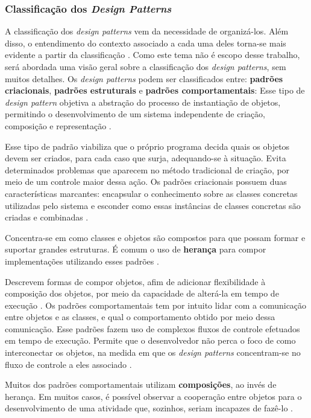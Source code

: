 \subsubsection{Classificação dos \textit{Design Patterns}}
A classificação dos \textit{design patterns} vem da necessidade de organizá-los. Além disso, o entendimento do contexto associado a cada uma deles torna-se mais evidente a partir da classificação \cite{gammaEtAl1994}. Como este tema não é escopo desse trabalho, será abordada uma visão geral sobre a classificação dos \textit{design patterns}, sem muitos detalhes. Os \textit{design patterns} podem ser classificados entre: \textbf{padrões criacionais}, \textbf{padrões estruturais} e \textbf{padrões comportamentais}:
Esse tipo de \textit{design pattern} objetiva a abstração do processo de instantiação de objetos, permitindo o desenvolvimento de um sistema independente de criação, composição e representação \cite{gammaEtAl1994}.
\par
\indent Esse tipo de padrão viabiliza que o próprio programa decida quais os objetos devem ser criados, para cada caso que surja, adequando-se à situação. Evita determinados problemas que aparecem no método tradicional de criação, por meio de um controle maior dessa ação. Os padrões criacionais possuem duas características marcantes: encapsular o conhecimento sobre as classes concretas utilizadas pelo sistema e esconder como essas instâncias de classes concretas são criadas e combinadas \cite{gammaEtAl1994}.
\par
\indent Concentra-se em como classes e objetos são compostos para que possam formar e suportar grandes estruturas. É comum o uso de \textbf{herança} para compor implementações utilizando esses padrões \cite{gammaEtAl1994}.
\par
\indent Descrevem formas de compor objetos, afim de adicionar flexibilidade à composição dos objetos, por meio da capacidade de alterá-la em tempo de execução \cite{gammaEtAl1994}.
Os padrões comportamentais tem por intuito lidar com a comunicação entre objetos e as classes, e qual o comportamento obtido por meio dessa comunicação. Esse padrões fazem uso de complexos fluxos de controle efetuados em tempo de execução. Permite que o desenvolvedor não perca o foco de como interconectar os objetos, na medida em que os \textit{design patterns} concentram-se no fluxo de controle a eles associado \cite{gammaEtAl1994}.
\par
\indent Muitos dos padrões comportamentais utilizam \textbf{composições}, ao invés de herança. Em muitos casos, é possível observar a cooperação entre objetos para o desenvolvimento de uma atividade que, sozinhos, seriam incapazes de fazê-lo \cite{gammaEtAl1994}.

